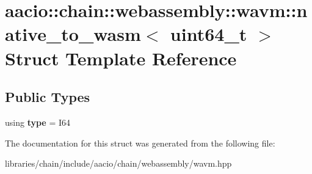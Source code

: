 \hypertarget{structaacio_1_1chain_1_1webassembly_1_1wavm_1_1native__to__wasm_3_01uint64__t_01_4}{}\section{aacio\+:\+:chain\+:\+:webassembly\+:\+:wavm\+:\+:native\+\_\+to\+\_\+wasm$<$ uint64\+\_\+t $>$ Struct Template Reference}
\label{structaacio_1_1chain_1_1webassembly_1_1wavm_1_1native__to__wasm_3_01uint64__t_01_4}
\subsection*{Public Types}
\begin{DoxyCompactItemize}
\item 
\mbox{\label{structaacio_1_1chain_1_1webassembly_1_1wavm_1_1native__to__wasm_3_01uint64__t_01_4_a05b19cf3aa23d5ef6927712f358702c5}} 
using {\bfseries type} = I64
\end{DoxyCompactItemize}


The documentation for this struct was generated from the following file\+:\begin{DoxyCompactItemize}
\item 
libraries/chain/include/aacio/chain/webassembly/wavm.\+hpp\end{DoxyCompactItemize}
